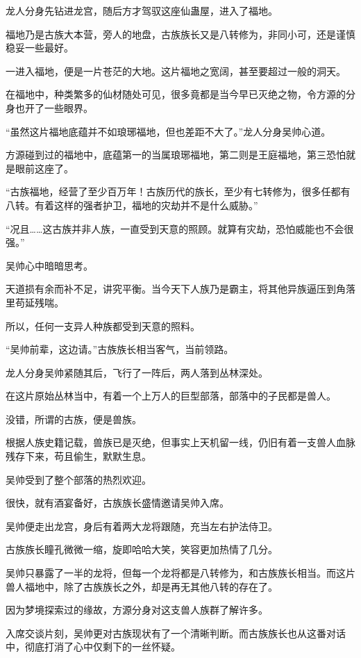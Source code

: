 
\begin{this_body}

龙人分身先钻进龙宫，随后方才驾驭这座仙蛊屋，进入了福地。

福地乃是古族大本营，旁人的地盘，古族族长又是八转修为，非同小可，还是谨慎稳妥一些最好。

一进入福地，便是一片苍茫的大地。这片福地之宽阔，甚至要超过一般的洞天。

在福地中，种类繁多的仙材随处可见，很多竟都是当今早已灭绝之物，令方源的分身也开了一些眼界。

“虽然这片福地底蕴并不如琅琊福地，但也差距不大了。”龙人分身吴帅心道。

方源碰到过的福地中，底蕴第一的当属琅琊福地，第二则是王庭福地，第三恐怕就是眼前这座了。

“古族福地，经营了至少百万年！古族历代的族长，至少有七转修为，很多任都有八转。有着这样的强者护卫，福地的灾劫并不是什么威胁。”

“况且……这古族并非人族，一直受到天意的照顾。就算有灾劫，恐怕威能也不会很强。”

吴帅心中暗暗思考。

天道损有余而补不足，讲究平衡。当今天下人族乃是霸主，将其他异族逼压到角落里苟延残喘。

所以，任何一支异人种族都受到天意的照料。

“吴帅前辈，这边请。”古族族长相当客气，当前领路。

龙人分身吴帅紧随其后，飞行了一阵后，两人落到丛林深处。

在这片原始丛林当中，有着一个上万人的巨型部落，部落中的子民都是兽人。

没错，所谓的古族，便是兽族。

根据人族史籍记载，兽族已是灭绝，但事实上天机留一线，仍旧有着一支兽人血脉残存下来，苟且偷生，默默生息。

吴帅受到了整个部落的热烈欢迎。

很快，就有酒宴备好，古族族长盛情邀请吴帅入席。

吴帅便走出龙宫，身后有着两大龙将跟随，充当左右护法侍卫。

古族族长瞳孔微微一缩，旋即哈哈大笑，笑容更加热情了几分。

吴帅只暴露了一半的龙将，但每一个龙将都是八转修为，和古族族长相当。而这片兽人福地中，除了古族族长之外，却是再无其他八转的存在了。

因为梦境探索过的缘故，方源分身对这支兽人族群了解许多。

入席交谈片刻，吴帅更对古族现状有了一个清晰判断。而古族族长也从这番对话中，彻底打消了心中仅剩下的一丝怀疑。


\end{this_body}
